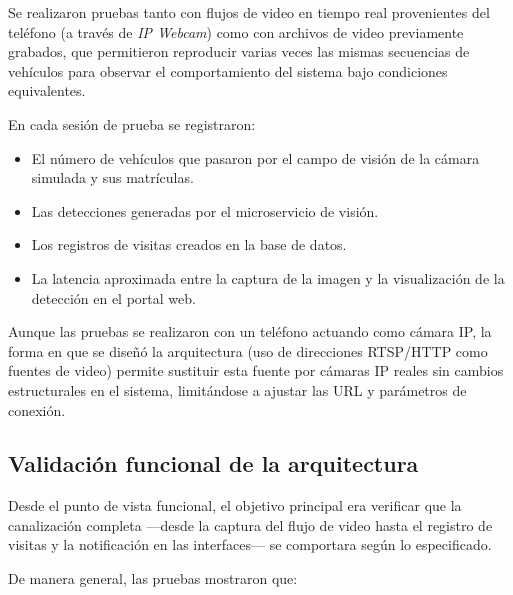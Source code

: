 Se realizaron pruebas tanto con flujos de video en tiempo real provenientes del teléfono (a través de \textit{IP Webcam}) como con archivos de video previamente grabados, que permitieron reproducir varias veces las mismas secuencias de vehículos para observar el comportamiento del sistema bajo condiciones equivalentes.

En cada sesión de prueba se registraron:

\begin{itemize}
    \item El número de vehículos que pasaron por el campo de visión de la cámara simulada y sus matrículas.
    \item Las detecciones generadas por el microservicio de visión.
    \item Los registros de visitas creados en la base de datos.
    \item La latencia aproximada entre la captura de la imagen y la visualización de la detección en el portal web.
\end{itemize}

Aunque las pruebas se realizaron con un teléfono actuando como cámara IP, la forma en que se diseñó la arquitectura (uso de direcciones RTSP/HTTP como fuentes de video) permite sustituir esta fuente por cámaras IP reales sin cambios estructurales en el sistema, limitándose a ajustar las URL y parámetros de conexión.

\subsection{Validación funcional de la arquitectura}

Desde el punto de vista funcional, el objetivo principal era verificar que la canalización completa ---desde la captura del flujo de video hasta el registro de visitas y la notificación en las interfaces--- se comportara según lo especificado.

De manera general, las pruebas mostraron que:

